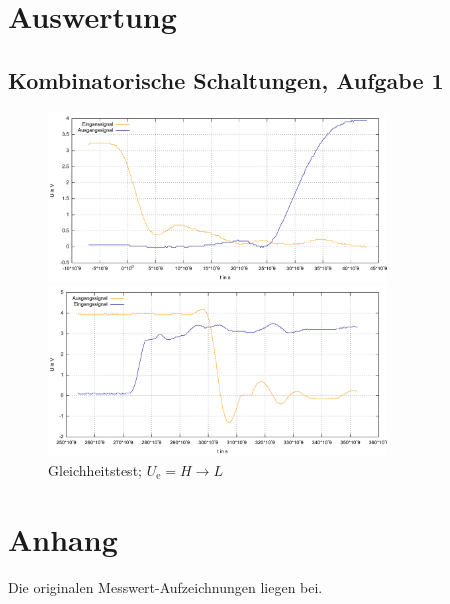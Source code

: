 \documentclass[numbers=noenddot,12pt,a4paper]{scrartcl}
\newcommand{\ix}[1]{_\text{#1}}
\begin{document}
\section{Auswertung}
\subsection{Kombinatorische Schaltungen, Aufgabe 1}
\begin{figure}[H]
\centering
\includegraphics[width=0.8\textwidth]{komb1.pdf}
\caption{Gleichheitstest; $U\ix{e}=H\rightarrow L$}
\includegraphics[width=0.8\textwidth]{komb2.pdf}
\end{figure}
\section{Anhang}
Die originalen Messwert-Aufzeichnungen liegen bei.
\end{document}

